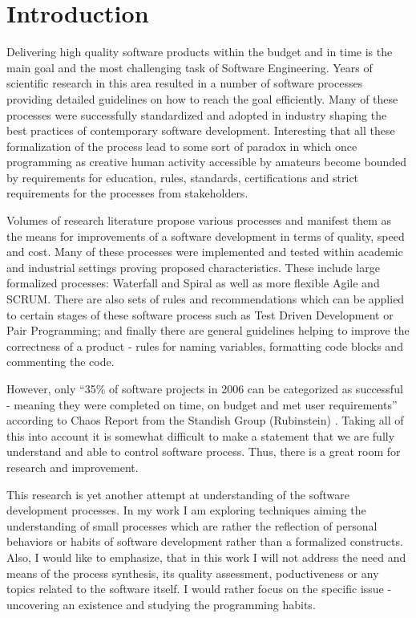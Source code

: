 \chapter{Introduction}
Delivering high quality software products within the budget and in time is the main goal and the most 
challenging task of Software Engineering. Years of scientific research in
this area resulted in a number of software processes providing detailed guidelines on how to reach 
the goal efficiently. Many of these processes were successfully standardized and adopted 
in industry shaping the best practices of contemporary software development. 
Interesting that all these formalization of the process lead to some sort of paradox in which 
once programming as creative human activity accessible by amateurs become bounded by requirements 
for education, rules, standards, certifications and strict requirements for the processes 
from stakeholders. 

Volumes of research literature propose various processes and manifest them as the 
means for improvements of a software development in terms of quality, speed and cost. 
Many of these processes were implemented and tested within academic and industrial 
settings proving proposed characteristics. These include large formalized processes: 
Waterfall and Spiral as well as more flexible Agile and SCRUM. 
There are also sets of rules and recommendations which can be applied to certain 
stages of these software process such as Test Driven Development or Pair Programming; 
and finally there are general guidelines helping to improve the correctness of a 
product - rules for naming variables, formatting code blocks and commenting the code. 

However, only ``35\% of software projects in 2006 can be categorized as successful - meaning 
they were completed on time, on budget and met user requirements'' according to Chaos Report
from the Standish Group (Rubinstein) \cite{SDTimes}. Taking all of this into account it is 
somewhat difficult to make a statement that we are fully understand and able to control 
software process. Thus, there is a great room for research and improvement.

This research is yet another attempt at understanding of the software development processes. 
In my work I am exploring techniques aiming the understanding of small processes which are 
rather the reflection of personal behaviors or habits of software development rather than a 
formalized constructs. Also, I would like to emphasize, that in this work I will not 
address the need and means of the process synthesis, its quality assessment, poductiveness
or any topics related to the software itself. I would rather focus on the specific issue - 
uncovering an existence and studying the programming habits. 

